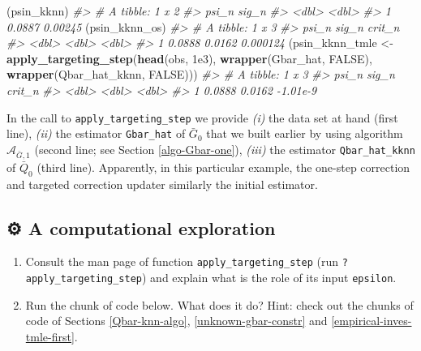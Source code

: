 \documentclass[11pt,openright,twoside]{book}
\newenvironment{Shaded}{\begin{snugshade}}{\end{snugshade}}
\newcommand{\CommentTok}[1]{\textcolor[rgb]{0.56,0.35,0.01}{\textit{#1}}}
\newcommand{\FloatTok}[1]{\textcolor[rgb]{0.00,0.00,0.81}{#1}}
\newcommand{\KeywordTok}[1]{\textcolor[rgb]{0.13,0.29,0.53}{\textbf{#1}}}
\newcommand{\NormalTok}[1]{#1}
\newcommand{\OtherTok}[1]{\textcolor[rgb]{0.56,0.35,0.01}{#1}}
\newcommand{\StringTok}[1]{\textcolor[rgb]{0.31,0.60,0.02}{#1}}
\newcommand{\gear}{\usebox{\gearbox}\;}
\newcommand{\Algo}{\widehat{\mathcal{A}}}
\newcommand{\Gbar}{\bar{G}}
\newcommand{\Qbar}{\bar{Q}}
\theoremstyle{definition}
\theoremstyle{definition}
\theoremstyle{definition}
\theoremstyle{remark}
\begin{document}
\begin{Shaded}
\begin{Highlighting}[]
\NormalTok{(psin_kknn)}
\CommentTok{#> # A tibble: 1 x 2}
\CommentTok{#>    psi_n   sig_n}
\CommentTok{#>    <dbl>   <dbl>}
\CommentTok{#> 1 0.0887 0.00245}
\NormalTok{(psin_kknn_os)}
\CommentTok{#> # A tibble: 1 x 3}
\CommentTok{#>    psi_n  sig_n   crit_n}
\CommentTok{#>    <dbl>  <dbl>    <dbl>}
\CommentTok{#> 1 0.0888 0.0162 0.000124}
\NormalTok{(psin_kknn_tmle <-}\StringTok{ }\KeywordTok{apply_targeting_step}\NormalTok{(}\KeywordTok{head}\NormalTok{(obs, }\FloatTok{1e3}\NormalTok{),}
                                        \KeywordTok{wrapper}\NormalTok{(Gbar_hat, }\OtherTok{FALSE}\NormalTok{),}
                                        \KeywordTok{wrapper}\NormalTok{(Qbar_hat_kknn, }\OtherTok{FALSE}\NormalTok{)))}
\CommentTok{#> # A tibble: 1 x 3}
\CommentTok{#>    psi_n  sig_n   crit_n}
\CommentTok{#>    <dbl>  <dbl>    <dbl>}
\CommentTok{#> 1 0.0888 0.0162 -1.01e-9}
\end{Highlighting}
\end{Shaded}

In the call to \texttt{apply\_targeting\_step} we provide \emph{(i)} the data set at hand
(first line), \emph{(ii)} the estimator \texttt{Gbar\_hat} of \(\Gbar_{0}\) that we built
earlier by using algorithm \(\Algo_{\Gbar,1}\) (second line; see Section
\ref{algo-Gbar-one}), \emph{(iii)} the estimator \texttt{Qbar\_hat\_kknn} of \(\Qbar_{0}\)
(third line). Apparently, in this particular example, the one-step correction
and targeted correction updater similarly the initial estimator.

\hypertarget{exo-tmle}{%
\subsection{\texorpdfstring{⚙ \gear A computational exploration}{⚙ A computational exploration}}\label{exo-tmle}}

\begin{enumerate}
\def\labelenumi{\arabic{enumi}.}
\item
  Consult the man page of function \texttt{apply\_targeting\_step} (run
  \texttt{?apply\_targeting\_step}) and explain what is the role of its input
  \texttt{epsilon}.
\item
  Run the chunk of code below. What does it do? Hint: check out the chunks of
  code of Sections \ref{Qbar-knn-algo}, \ref{unknown-gbar-constr} and
  \ref{empirical-inves-tmle-first}.
\end{enumerate}
\end{document}
